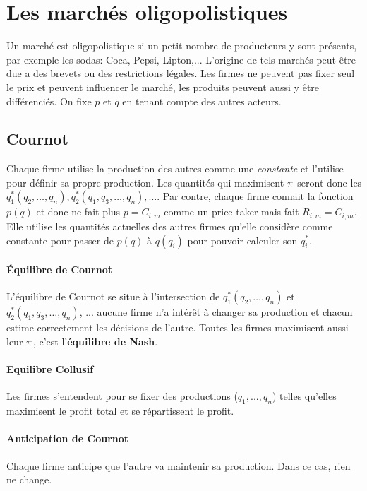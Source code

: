 \section{Les marchés oligopolistiques}
Un marché est oligopolistique si un
petit nombre de producteurs y sont présents,
par exemple les sodas: Coca, Pepsi, Lipton,...
L'origine de tels marchés peut être due a
des brevets ou des restrictions légales.
Les firmes ne peuvent pas fixer seul le prix et peuvent influencer le marché,
les produits peuvent aussi y être différenciés.
On fixe $p$ et $q$ en tenant compte des autres acteurs.

\subsection{Cournot}
Chaque firme utilise la production des autres comme une \emph{constante}
et l'utilise pour définir sa propre production.
Les quantités qui maximisent $\pi$ seront
donc les $q_1^*(q_2, \ldots, q_n), q_2^*(q_1, q_3, \ldots, q_n),\ldots$.
Par contre, chaque firme connait la fonction $p(q)$ et donc ne fait
plus $p = C_{i,m}$ comme un price-taker mais fait $R_{i,m} = C_{i,m}$.
Elle utilise les quantités actuelles des autres firmes qu'elle
considère comme constante pour passer de $p(q)$ à $q(q_i)$
pour pouvoir calculer son $q_i^*$.

\paragraph{Équilibre de Cournot}
L'équilibre de Cournot se situe à l'intersection
de $q_1^*(q_2, \ldots, q_n)$ et $q_2^*(q_1, q_3, \ldots, q_n)$, ...
aucune firme n'a intérêt à changer sa production et chacun estime correctement
les décisions de l'autre.
Toutes les firmes maximisent aussi leur $\pi$,
c'est l'\textbf{équilibre de Nash}.

\paragraph{Equilibre Collusif}
Les firmes s'entendent pour se fixer des productions ($q_1,...,q_n$) telles
qu'elles maximisent le profit total et se répartissent le profit.

\paragraph{Anticipation de Cournot}
Chaque firme anticipe que l'autre va maintenir sa production.
Dans ce cas, rien ne change.

